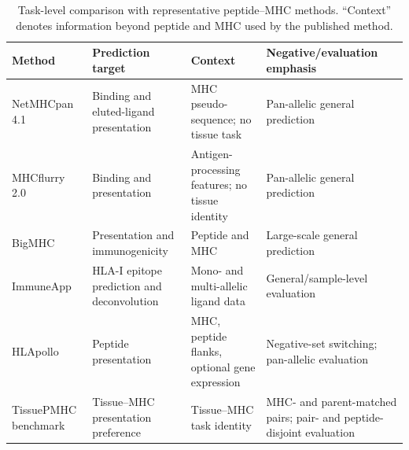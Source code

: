 \begin{table}[tbp]
\centering
\caption{Task-level comparison with representative peptide--MHC methods. ``Context'' denotes information beyond peptide and MHC used by the published method.}
\label{tab:closest-work}
\scriptsize
\setlength{\tabcolsep}{2pt}
\begin{tabular}{@{}>{\raggedright\arraybackslash}p{1.8cm}>{\raggedright\arraybackslash}p{2.5cm}>{\raggedright\arraybackslash}p{2.3cm}>{\raggedright\arraybackslash}p{2.6cm}@{}}
\toprule
Method & Prediction target & Context & Negative/evaluation emphasis \\
\midrule
NetMHCpan 4.1 \cite{reynisson2020netmhcpan} & Binding and eluted-ligand presentation & MHC pseudo-sequence; no tissue task & Pan-allelic general prediction \\
MHCflurry 2.0 \cite{odonnell2020mhcflurry} & Binding and presentation & Antigen-processing features; no tissue identity & Pan-allelic general prediction \\
BigMHC \cite{albert2023bigmhc} & Presentation and immunogenicity & Peptide and MHC & Large-scale general prediction \\
ImmuneApp \cite{xu2024immuneapp} & HLA-I epitope prediction and deconvolution & Mono- and multi-allelic ligand data & General/sample-level evaluation \\
HLApollo \cite{thrift2024hlapollo} & Peptide presentation & MHC, peptide flanks, optional gene expression & Negative-set switching; pan-allelic evaluation \\
TissuePMHC benchmark & Tissue--MHC presentation preference & Tissue--MHC task identity & MHC- and parent-matched pairs; pair- and peptide-disjoint evaluation \\
\bottomrule
\end{tabular}
\end{table}
